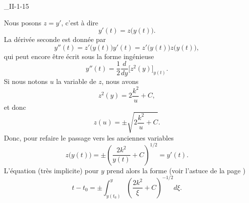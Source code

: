 

\begin{corrige}{_II-1-15}


Nous posons $z=y'$, c'est à dire
\begin{equation}
	y'(t)=z\big( y(t) \big).
\end{equation}
La dérivée seconde est donnée par
\begin{equation}
	y''(t)=z'\big( y(t) \big)y'(t)=z'\big( y(t) \big)z\big( y(t) \big),
\end{equation}
qui peut encore être écrit sous la forme ingénieuse
\begin{equation}
	y''(t)=\frac{ 1 }{2}\frac{ d }{ dy }\Big[ z^2(y) \Big]_{y(t)}.
\end{equation}
Si nous notons $u$ la variable de $z$, nous avons
\begin{equation}
	z^2(y)=2\frac{ k^2 }{ u }+C,
\end{equation}
et donc
\begin{equation}
	z(u)=\pm\sqrt{ 2\frac{ k^2 }{ u }+C }.
\end{equation}
Donc, pour refaire le passage vers les anciennes variables
\begin{equation}		\label{EqEqPourPrimeII115}
	z\big( y(t) \big)=\pm\left( \frac{ 2k^2 }{ y(t) }+C \right)^{1/2}=y'(t).
\end{equation}
L'équation (très implicite) pour $y$ prend alors la forme (voir l'astuce de la page \pageref{SecFairedzdt})
\begin{equation}		\label{EqGeneII115IntCsol}
	t-t_0=\pm\int_{y(t_0)}^y\left( \frac{ 2k^2 }{ \xi }+C \right)^{-1/2}d\xi.
\end{equation}



\end{corrige}
